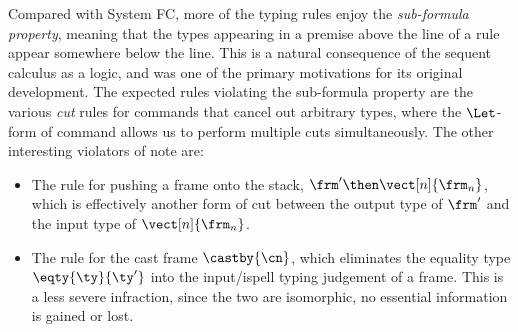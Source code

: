 \documentclass{article}
\begin{document}
Compared with System FC, more of the typing rules enjoy the
\emph{sub-formula property}, meaning that the types appearing in a premise above
the line of a rule appear somewhere below the line.  This is a natural
consequence of the sequent calculus as a logic, and was one of the primary
motivations for its original development.  The expected rules violating the
sub-formula property are the various \emph{cut} rules for commands that cancel
out arbitrary types, where the $\Let$-form of command allows us to perform
multiple cuts simultaneously.  The other interesting violators of note are:
\begin{itemize}
\item The rule for pushing a frame onto the stack,
  $\frm' \then \vect[n]{\frm_n}$, which is effectively another form of cut
  between the output type of $\frm'$ and the input type of $\vect[n]{\frm_n}$.

\item The rule for the cast frame $\castby{\cn}$, which eliminates the equality
  type $\eqty{\ty}{\ty'}$ into the input/ispell typing judgement of a frame.
  This is a less severe infraction, since the two are isomorphic, no essential
  information is gained or lost.





\end{itemize}
\end{document}
